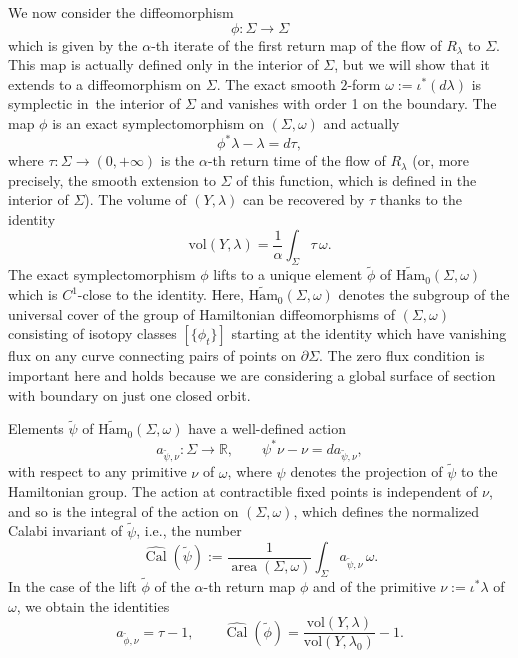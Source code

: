 \documentclass[11pt]{article}
\newcommand{\ie}{i.e.,\xspace}
\numberwithin{equation}{section}
\let\mathds\mathbb
\theoremstyle{definition}
\DeclareMathOperator{\area}{area}
\DeclareMathOperator{\Cal}{Cal}
\newcommand{\vol}{\mathrm{vol}}
\newcommand{\R}{\mathds{R}}
\begin{document}
We now consider the diffeomorphism
\[
\phi: \Sigma\to \Sigma
\]
which is given by the $\alpha$-th iterate of the first return map of the flow of $R_{\lambda}$ to $\Sigma$. This map is actually defined only in the interior of $\Sigma$, but we will show that it extends to a diffeomorphism on $\Sigma$. The exact smooth $2$-form $\omega:= \iota^*(d\lambda)$ is symplectic in~the interior of $\Sigma$ and vanishes with order 1 on the boundary. The map $\phi$ is an exact symplectomorphism on $(\Sigma,\omega)$ and actually
\[
\phi^* \lambda - \lambda = d\tau,
\]
where $\tau: \Sigma \to (0,+\infty)$ is the $\alpha$-th return time of the flow of $R_{\lambda}$ (or, more precisely, the smooth extension to $\Sigma$ of this function, which is defined in the interior of $\Sigma$). The volume of $(Y,\lambda)$ can be recovered by $\tau$ thanks to the identity
\[
\vol(Y,\lambda) = \frac{1}{\alpha} \int_{\Sigma} \tau\, \omega.
\]
The exact symplectomorphism $\phi$ lifts to a unique element $\tilde\phi$ of $\widetilde{\mathrm{Ham}}_0(\Sigma,\omega)$ which is $C^1$-close to the identity. Here, $\widetilde{\mathrm{Ham}}_0(\Sigma,\omega)$ denotes the subgroup of the universal cover of the group of Hamiltonian diffeomorphisms of $(\Sigma,\omega)$ consisting of isotopy classes $[\{\phi_t\}]$ starting at the identity which have vanishing flux on any curve connecting pairs of points on $\partial \Sigma$. The zero flux condition is important here and holds because we are considering a global surface of section with boundary on just one closed orbit.

Elements $\tilde{\psi}$ of $\widetilde{\mathrm{Ham}}_0(\Sigma,\omega)$ have a well-defined action
\[
a_{\tilde{\psi},\nu} : \Sigma \to \R, \qquad \psi^* \nu - \nu = d a_{\tilde{\psi},\nu},
\]
with respect to any primitive $\nu$ of $\omega$, where $\psi$ denotes the projection of $\tilde{\psi}$ to the Hamiltonian group. The action at contractible fixed points is independent of $\nu$, and so is the integral of the action on $(\Sigma,\omega)$, which defines the normalized Calabi invariant of $\tilde{\psi}$, \ie the number
\[
\widehat{\Cal}(\tilde{\psi}) := \frac{1}{\area(\Sigma,\omega)} \int_{\Sigma} a_{\tilde{\psi},\nu} \, \omega.
\]
In the case of the lift $\tilde{\phi}$ of the $\alpha$-th return map $\phi$ and of the primitive $\nu:= \iota^*\lambda$ of $\omega$, we obtain the identities
\begin{equation}
\label{intro1}
a_{\tilde{\phi},\nu} = \tau - 1, \qquad \widehat{\Cal}(\tilde{\phi}) = \frac{\vol(Y,\lambda)}{\vol(Y,\lambda_0)} - 1.
\end{equation}
\end{document}
